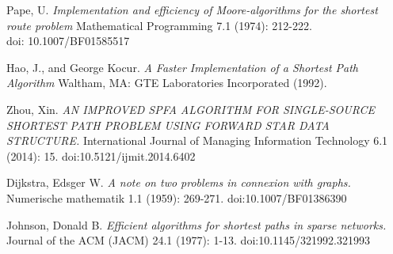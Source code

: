 \documentclass{article}
\begin{document}
\begin{thebibliography}{9}
Pape, U. \textit{Implementation and efficiency of Moore-algorithms for the shortest route problem} Mathematical Programming 7.1 (1974): 212-222.\\
doi: 10.1007/BF01585517

Hao, J., and George Kocur. \textit{A Faster Implementation of a Shortest Path Algorithm} Waltham, MA: GTE Laboratories Incorporated (1992).

Zhou, Xin. \textit{AN IMPROVED SPFA ALGORITHM FOR SINGLE-SOURCE SHORTEST PATH PROBLEM USING FORWARD STAR DATA STRUCTURE.} International Journal of Managing Information Technology 6.1 (2014): 15.
doi:10.5121/ijmit.2014.6402

Dijkstra, Edsger W. \textit{A note on two problems in connexion with graphs.} Numerische mathematik 1.1 (1959): 269-271.
doi:10.1007/BF01386390

Johnson, Donald B. \textit{Efficient algorithms for shortest paths in sparse networks.} Journal of the ACM (JACM) 24.1 (1977): 1-13.
doi:10.1145/321992.321993


\end{thebibliography}
\end{document}
